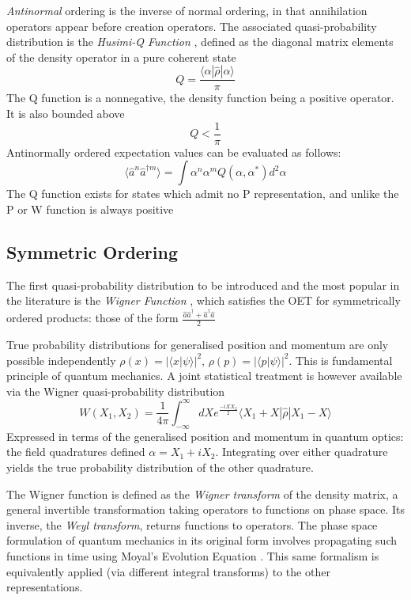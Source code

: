 \documentclass[reqno]{amsart}
\newcommand{\cre}{\hat{a}^\dagger}
\newcommand{\ann}{\hat{a}}
\newcommand{\dens}{\hat{\rho}}
\newcommand{\ket}[1]{| #1 \rangle}
\newcommand{\bra}[1]{\langle #1 |}
\newcommand{\braket}[2]{\langle #1 | #2 \rangle}
\begin{document}
\emph{Antinormal} ordering is the inverse of normal ordering, in that annihilation operators appear before creation operators. The associated quasi-probability distribution is the \emph{Husimi-Q Function} \autocite{Husimi1940}, defined as the diagonal matrix elements of the density operator in a pure coherent state
\begin{equation}
	Q = \frac{\langle \alpha | \dens | \alpha \rangle}{\pi}
	\label{qdef}
\end{equation}
The Q function is a nonnegative, the density function being a positive operator. It is also bounded above 
\begin{equation}
	Q < \frac{1}{\pi}
\end{equation}
Antinormally ordered expectation values can be evaluated as follows:
\begin{equation}
	\langle \hat{a}^n \hat{a}^{\dagger m}  \rangle = \int \alpha^n \alpha^m Q (\alpha, \alpha^*) d^2 \alpha
\end{equation}
The Q function exists for states which admit no P representation, and unlike the P or W function is always positive

\subsection{Symmetric Ordering}

The first quasi-probability distribution to be introduced and the most popular in the literature is the \emph{Wigner Function} \autocite{Wigner1932}, which satisfies the OET for symmetrically ordered products: those of the form $\frac{\ann \cre + \cre \ann}{2}$

True probability distributions for generalised position and momentum are only possible independently $\rho(x) = |\braket{x}{\psi}|^2$, $\rho(p) = |\braket{p}{\psi}|^2$. This is fundamental principle of quantum mechanics. A joint statistical treatment is however available via the Wigner quasi-probability distribution
\begin{equation}
	W(X_1, X_2) = \frac{1}{4 \pi} \int_{-\infty}^\infty dX e^{\frac{-iXX_2}{2}} \bra{X_1+X} \dens \ket{X_1-X}
\end{equation}
Expressed in terms of the generalised position and momentum in quantum optics: the field quadratures defined $\alpha = X_1 + iX_2$. Integrating over either quadrature yields the true probability distribution of the other quadrature.

The Wigner function is defined as the \emph{Wigner transform} of the density matrix, a general invertible transformation taking operators to functions on phase space. Its inverse, the \emph{Weyl transform}, returns functions to operators. The phase space formulation of quantum mechanics in its original form involves propagating such functions in time using Moyal's Evolution Equation \autocite{Curtright2011}. This same formalism is equivalently applied (via different integral transforms) to the other representations.
\end{document}
